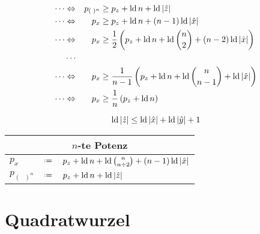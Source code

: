 \begin{equation*}
\begin{split}
  \cdots
  & \Leftrightarrow & 
  p_{(\phantom{\cdot})^n} & \ge p_z+\mathop{\rm ld}\nolimits n+\mathop{\rm ld}\nolimits|\hat{z}|
  \\
  \cdots
  & \Leftrightarrow & 
  p_x  & \ge p_z+\mathop{\rm ld}\nolimits n+(n-1)\mathop{\rm ld}\nolimits|\hat{x}|
  \\
  \cdots
  & \Leftrightarrow & 
  p_x  & \ge \frac{1}{2}\left(p_z+\mathop{\rm ld}\nolimits n+\mathop{\rm ld}\nolimits\binom{n}{2}+(n-2)\mathop{\rm ld}\nolimits|\hat{x}|\right)
  \\
  & \cdots
  \\
  \cdots
  & \Leftrightarrow & 
  p_x  & \ge \frac{1}{n-1}\left(p_z+\mathop{\rm ld}\nolimits n+\mathop{\rm ld}\nolimits\binom{n}{n-1}+\mathop{\rm ld}\nolimits|\hat{x}|\right)
  \\
  \cdots
  & \Leftrightarrow & 
  p_x  & \ge \frac{1}{n}\left(p_z+\mathop{\rm ld}\nolimits n\right)
  \\
\end{split}
\end{equation*}

\begin{equation*}
  \ld|\hat{z}| \le \ld|\hat{x}|+\ld|\hat{y}|+1 %
\end{equation*}

\begin{algorithm}
\phantom{}
\begin{center}
\renewcommand*{\arraystretch}{1.3}
\begin{tabular}{lcl}
  \hline
  \multicolumn{3}{c}{$n$-te Potenz} \\
  \hline
   $p_x$      & $\defeq$ & $p_z+\mathop{\rm ld}\nolimits n+\mathop{\rm ld}\nolimits\binom{n}{n\div2}+(n-1)\mathop{\rm ld}\nolimits|\hat{x}|$ \\
   $p_{(\phantom{\cdot})^n}$ & $\defeq$ & $p_z+\mathop{\rm ld}\nolimits n+\mathop{\rm ld}\nolimits|\hat{z}|$ \\
  \hline
\end{tabular}
\end{center}
\end{algorithm}






\pagebreak
\section{Quadratwurzel}

\newcommand{\op}{{\sqrt[2]{\phantom{\cdot}}}}

